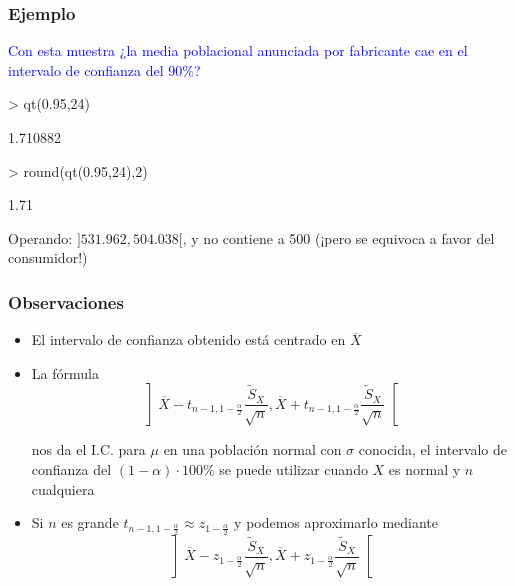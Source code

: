 \documentclass[12pt,t]{beamer}
\newcommand{\blue}[1]{\textcolor{blue}{#1}}
\renewcommand{\emph}[1]{{\color{red}#1}}
\theoremstyle{plain}
\theoremstyle{definition}
\begin{document}
\begin{frame}[fragile]
\frametitle{Ejemplo}

\blue{Con esta muestra ¿la media   poblacional anunciada por fabricante cae en el  intervalo de confianza  del 90\%?}

\begin{Schunk}
\begin{Sinput}
> qt(0.95,24)
\end{Sinput}
\begin{Soutput}
[1] 1.710882
\end{Soutput}
\begin{Sinput}
> round(qt(0.95,24),2)
\end{Sinput}
\begin{Soutput}
[1] 1.71
\end{Soutput}
\end{Schunk}

Operando: $]531.962,504.038[$, y no contiene a 500 (¡pero se equivoca a favor del consumidor!)
\end{frame}



\begin{frame}
\frametitle{Observaciones }

\begin{itemize}
\item El intervalo de confianza  obtenido  está centrado   en $\overline{X}$
\medskip

\item La fórmula
$$
\left] 
\overline{X}-t_{n-1,1-\frac{\alpha}{2}} \frac{\widetilde{S}_{X}}{\sqrt{n}},
\overline{X}+t_{n-1,1-\frac{\alpha}{2}}\frac{\widetilde{S}_{X}}{\sqrt{n}} \right[
$$

nos da el I.C. para $\mu$ en una población normal con $\sigma$ conocida, el   intervalo de confianza  del $(1-\alpha)\cdot 100\%$ se  puede utilizar  cuando $X$ es normal y $n$ cualquiera
\bigskip

\item Si $n$ es grande $t_{n-1,1-\frac{\alpha}{2}}\approx z_{1-\frac{\alpha}{2}}$ y podemos \emph{aproximarlo}  mediante
$$
\left] 
\overline{X}-z_{1-\frac{\alpha}{2}} \frac{\widetilde{S}_{X}}{\sqrt{n}},
\overline{X}+z_{1-\frac{\alpha}{2}}\frac{\widetilde{S}_{X}}{\sqrt{n}} \right[
$$
\end{itemize}


\end{frame}
\end{document}

